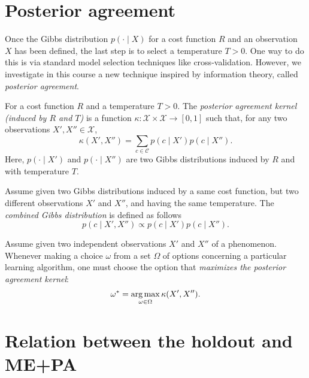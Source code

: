 \section{Posterior agreement}
\label{sec:pa_mepa}

Once the Gibbs distribution $p(\cdot \mid X)$ for a cost function $R$ and an observation $X$ has been defined, the last step is to select a temperature $T > 0$. One way to do this is via standard model selection techniques like cross-validation. However, we investigate in this course a new technique inspired by information theory, called \emph{posterior agreement}.

\begin{definition}
For a cost function $R$ and a temperature $T > 0$.  The \emph{posterior agreement kernel (induced by $R$ and $T$)} is a function $\kappa : \mathcal{X} \times \mathcal{X} \to [0,1]$ such that, for any two observations $X', X'' \in \mathcal{X}$,
%
\begin{equation}
\kappa(X', X'') = \sum_{c \in \mathcal{C}} p(c \mid X') p(c \mid X'').
\end{equation}
%
Here, $p(\cdot \mid X')$ and $p(\cdot \mid X'')$ are two Gibbs distributions induced by $R$ and with temperature $T$.
\end{definition}

\begin{definition}
Assume given two Gibbs distributions induced by a same cost function, but two different observations $X'$ and $X''$, and having the same temperature.
The \emph{combined Gibbs distribution} is defined as follows
%
\begin{equation}
p(c \mid X', X'') \propto p(c \mid X') p(c \mid X'').
\end{equation}
%
\end{definition}

\begin{definition}
Assume given two independent observations $X'$ and $X''$ of a phenomenon. Whenever making a choice $\omega$ from a set $\Omega$ of options concerning a particular learning algorithm, one must choose the option that \emph{maximizes the posterior agreement kernel}:
%
\begin{equation}
\omega^* = \operatorname*{arg\,max}_{\omega \in \Omega} \kappa(X', X'').
\end{equation}
%
\end{definition}

\section{Relation between the holdout and ME+PA}

